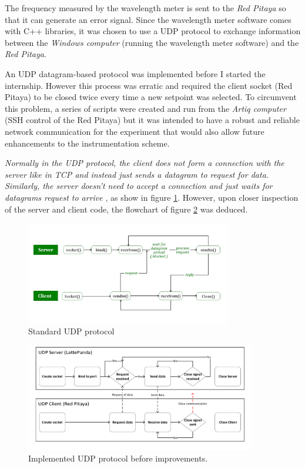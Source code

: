 \documentclass[a4paper,12pt]{article}
\begin{document}
The frequency measured by the wavelength meter is sent to the \textit{Red Pitaya} so that it can generate an error signal. Since the wavelength meter software comes with C++ libraries, it was chosen to use a UDP protocol to exchange information between the \textit{Windows computer} (running the wavelength meter software) and the \textit{Red Pitaya}.

An UDP datagram-based protocol was implemented before I started the internship. However this process was erratic and required the client socket (Red Pitaya) to be closed twice every time a new setpoint was selected. To circumvent this problem, a series of scripts were created and run from the \textit{Artiq computer} (SSH control of the Red Pitaya) but it was intended to have a robust and reliable network communication for the experiment that would also allow future enhancements to the instrumentation scheme.

\textit{Normally in the UDP protocol, the client does not form a connection with the server like in TCP and instead just sends a datagram to request for data. Similarly, the server doesn't need to accept a connection and just waits for datagrams request to arrive} \cite{geeksforgeeks_2022}, as show in figure \ref{fig:server-and-client}. However, upon closer inspection of the server and client code, the flowchart of figure \ref{fig:udp_before} was deduced.

\begin{figure}[!h]
    \centering
    \includegraphics[width=0.8\textwidth]{Images/server-and-client.jpg}
    \captionsetup{justification=centering}
    \caption{Standard UDP protocol \cite{geeksforgeeks_2022}}
    \label{fig:server-and-client}
\end{figure}

\begin{figure}[!h]
    \centering
    \includegraphics[width=0.9\textwidth]{Images/UDP_before.pdf}
    \captionsetup{justification=centering}
    \caption{Implemented UDP protocol before improvements.}
    \label{fig:udp_before}
\end{figure}
\end{document}
